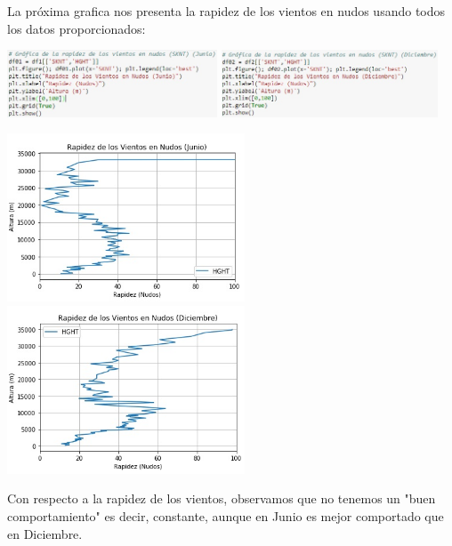 \documentclass[12pt]{article}
\begin{document}
La próxima grafica nos presenta la rapidez de los vientos en nudos usando todos los datos proporcionados:
\begin{center}
	\includegraphics[height=2cm]{dj4.jpg} \hspace*{\fill}
    \includegraphics[height=2cm]{dd4.jpg}
\end{center}
\begin{center}
	\includegraphics[height=5cm]{gj4.jpg}  \hspace*{\fill}
    \includegraphics[height=5cm]{gd4.jpg}
\end{center}
Con respecto a la rapidez de los vientos, observamos que no tenemos un "buen comportamiento" es decir, constante, aunque en Junio es mejor comportado que en Diciembre.\\
\\
\end{document}
